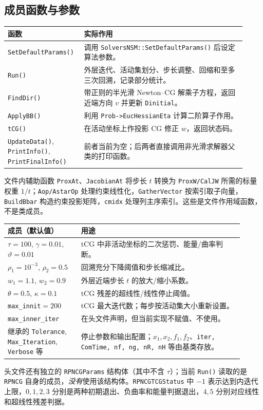 \documentclass[a4paper,10pt]{article}
\newcommand{\code}[1]{\texttt{#1}}
\begin{document}
\subsection{成员函数与参数}
\begin{center}
\small
\begin{tabular}{@{}p{0.27\linewidth}p{0.65\linewidth}@{}}
\toprule
函数 & 实际作用 \\ \midrule
\code{SetDefaultParams()} & 调用 \code{SolversNSM::SetDefaultParams()} 后设定算法参数。 \\
\code{Run()} & 外层迭代、活动集划分、步长调整、回缩和至多三次回溯，记录部分统计。 \\
\code{FindDir()} & 带正则的半光滑 Newton--CG 解乘子方程，返回近端方向 $v$ 并更新 \code{Dinitial}。 \\
\code{ApplyBB()} & 利用 \code{Prob->EucHessianEta} 计算二阶算子作用。 \\
\code{tCG()} & 在活动坐标上作投影 CG 修正 $w$，返回状态码。 \\
\code{UpdateData()}, \code{PrintInfo()}, \code{PrintFinalInfo()} & 前者当前为空；后两者直接调用非光滑求解器父类的打印函数。 \\
\bottomrule
\end{tabular}
\end{center}
文件内辅助函数 \code{ProxAt}、\code{JacobianAt} 将步长 $t$ 转换为 \code{ProxW/CalJW} 所需的标量权重 $1/t$；\code{Aop/AstarOp} 处理约束线性化，\code{GatherVector} 按索引取子向量，\code{BuildBbar} 构造约束投影矩阵，\code{cmidx} 处理列主序索引。这些是文件作用域函数，不是类成员。

\begin{center}
\small
\begin{tabular}{@{}p{0.29\linewidth}p{0.62\linewidth}@{}}
\toprule
成员（默认值） & 用途 \\ \midrule
$\tau=100$, $\gamma=0.01$, $\vartheta=0.01$ & tCG 中非活动坐标的二次惩罚、能量/曲率判断。 \\
$\rho_1=10^{-3}$, $\rho_2=0.5$ & 回溯充分下降阈值和步长缩减比。 \\
$w_1=1.1$, $w_2=0.9$ & 外层近端步长 $t$ 的放大/缩小系数。 \\
$\theta=0.5$, $\kappa=0.1$ & tCG 残差的超线性/线性停止阈值。 \\
\code{max\_innit}$=200$ & tCG 最大迭代数；每步按活动集大小重新设置。 \\
\code{max\_inner\_iter} & 在头文件声明，但当前实现不赋值、不使用。 \\
继承的 \code{Tolerance}, \code{Max\_Iteration}, \code{Verbose} 等 & 停止参数和输出配置；$x_1,x_2,f_1,f_2$、\code{iter, ComTime, nf, ng, nR, nH} 等由基类存放。 \\
\bottomrule
\end{tabular}
\end{center}
头文件还有独立的 \code{RPNCGParams} 结构体（其中不含 $\tau$）；当前 \code{Run()} 读取的是 \code{RPNCG} 自身的成员，\emph{没有}使用该结构体。\code{RPNCGTCGStatus} 中 $-1$ 表示达到内迭代上限，$0,1,2,3$ 分别是两种初期退出、负曲率和能量判据退出，$4,5$ 分别对应线性和超线性残差判据。
\end{document}
